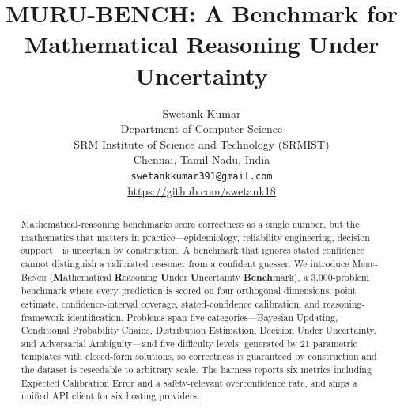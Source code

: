 \documentclass{article}
\title{MURU-BENCH: A Benchmark for Mathematical Reasoning Under Uncertainty}
\author{
  Swetank Kumar \\
  Department of Computer Science \\
  SRM Institute of Science and Technology (SRMIST) \\
  Chennai, Tamil Nadu, India \\
  \texttt{swetankkumar391@gmail.com} \\
  \url{https://github.com/swetank18}
}
\newcommand{\muru}{\textsc{Muru-Bench}}
\begin{document}
\maketitle

\begin{abstract}
Mathematical-reasoning benchmarks score correctness as a single number, but the mathematics that matters in practice---epidemiology, reliability engineering, decision support---is uncertain by construction. A benchmark that ignores stated confidence cannot distinguish a calibrated reasoner from a confident guesser. We introduce \muru{} (\textbf{M}athematical \textbf{R}easoning \textbf{U}nder \textbf{U}ncertainty \textbf{Bench}mark), a 3{,}000-problem benchmark where every prediction is scored on four orthogonal dimensions: point estimate, confidence-interval coverage, stated-confidence calibration, and reasoning-framework identification. Problems span five categories---Bayesian Updating, Conditional Probability Chains, Distribution Estimation, Decision Under Uncertainty, and Adversarial Ambiguity---and five difficulty levels, generated by 21 parametric templates with closed-form solutions, so correctness is guaranteed by construction and the dataset is reseedable to arbitrary scale. The harness reports six metrics including Expected Calibration Error and a safety-relevant overconfidence rate, and ships a unified API client for six hosting providers.


\end{abstract}
\end{document}
